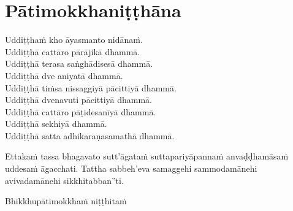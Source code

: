 \section{Pātimokkhaniṭṭhāna}
\label{patimokkhanitthana}

Uddiṭṭhaṁ kho āyasmanto nidānaṁ.\\
Uddiṭṭhā cattāro pārājikā dhammā.\\
Uddiṭṭhā terasa saṅghādisesā dhammā.\\
Uddiṭṭhā dve aniyatā dhammā.\\
Uddiṭṭhā tiṁsa nissaggiyā pācittiyā dhammā.\\
Uddiṭṭhā dvenavuti pācittiyā dhammā.\\
Uddiṭṭhā cattāro pāṭidesanīyā dhammā.\\
Uddiṭṭhā sekhiyā dhammā.\\
Uddiṭṭhā satta adhikaraṇasamathā dhammā.

Ettakaṁ tassa bhagavato sutt'āgataṁ suttapariyāpannaṁ anvaḍḍhamāsaṁ uddesaṁ āgacchati. Tattha sabbeh'eva samaggehi sammodamānehi avivadamānehi sikkhitabban''ti.

\begin{outro}
  Bhikkhupātimokkhaṁ niṭṭhitaṁ
\end{outro}

\clearpage
